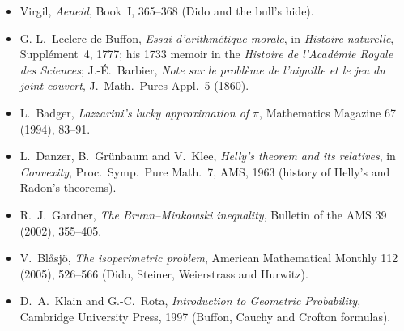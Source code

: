 \begin{itemize}
\item Virgil, \emph{Aeneid}, Book~I, 365--368 (Dido and the bull's hide).
\item G.-L.~Leclerc de Buffon, \emph{Essai d'arithm\'etique morale}, in \emph{Histoire naturelle}, Suppl\'ement~4, 1777; his 1733 memoir in the \emph{Histoire
de l'Acad\'emie Royale des Sciences}; J.-\'E.~Barbier, \emph{Note sur le probl\`eme de l'aiguille et le jeu du joint couvert}, J.\ Math.\ Pures Appl.\ 5 (1860).
\item L.~Badger, \emph{Lazzarini's lucky approximation of $\pi$}, Mathematics Magazine 67 (1994), 83--91.
\item L.~Danzer, B.~Gr\"unbaum and V.~Klee, \emph{Helly's theorem and its relatives}, in \emph{Convexity}, Proc.\ Symp.\ Pure Math.\ 7, AMS, 1963 (history of
Helly's and Radon's theorems).
\item R.~J.~Gardner, \emph{The Brunn--Minkowski inequality}, Bulletin of the AMS 39 (2002), 355--405.
\item V.~Bl\aa sj\"o, \emph{The isoperimetric problem}, American Mathematical Monthly 112 (2005), 526--566 (Dido, Steiner, Weierstrass and Hurwitz).
\item D.~A.~Klain and G.-C.~Rota, \emph{Introduction to Geometric Probability}, Cambridge University Press, 1997 (Buffon, Cauchy and Crofton formulas).
\end{itemize}
